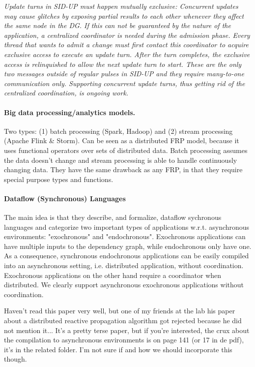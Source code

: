 \emph{Update turns in SID-UP must happen mutually exclusive:
Concurrent updates may cause glitches by exposing partial
results to each other whenever they affect the same node in
the DG. If this can not be guaranteed by the nature of the
application, a centralized coordinator is needed during the
admission phase. Every thread that wants to admit a change
must first contact this coordinator to acquire exclusive access
to execute an update turn. After the turn completes, the
exclusive access is relinquished to allow the next update turn
to start. These are the only two messages outside of regular
pulses in SID-UP and they require many-to-one communication
only. Supporting concurrent update turns, thus getting
rid of the centralized coordination, is ongoing work.}


\paragraph{Big data processing/analytics models.} Two types: (1) batch processing (Spark, Hadoop) \cite{mapreduce} and (2) stream processing (Apache Flink \& Storm). Can be seen as a  distributed FRP model, because it uses functional operators over sets of distributed data. Batch processing assumes the data doesn't change and stream processing is able to handle continuously changing data. They have the same drawback as any FRP, in that they require special purpose types and functions.


\paragraph{Dataflow (Synchronous) Languages}
\cite{syncdataflow}
The main idea is that they describe, and formalize, dataflow sychronous languages and categorize two important types of applications w.r.t. asynchronous environments: "exochronous" and "endochronous". Exochronous applications can have multiple inputs to the dependency graph, while endochronous only have one. As a consequence, synchronous endochronous applications can be easily compiled into an asynchronous setting, i.e. distributed application, without coordination. Exochronous applications on the other hand require a coordinator when distributed. \newline
We clearly support asynchronous exochronous applications without coordination.

Haven't read this paper very well, but one of my friends at the lab his paper about a distributed reactive propagation algorithm got rejected because he did not mention it...
It's a pretty terse paper, but if you're interested, the crux about the compilation to asynchronous environments is on page 141 (or 17 in de pdf), it's in the related folder. I'm not sure if and how we should incorporate this though. \newline


